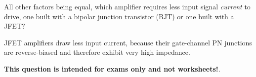 

All other factors being equal, which amplifier requires less input signal {\it current} to drive, one built with a bipolar junction transistor (BJT) or one built with a JFET?







JFET amplifiers draw less input current, because their gate-channel PN junctions are reverse-biased and therefore exhibit very high impedance.







{\bf This question is intended for exams only and not worksheets!}.




